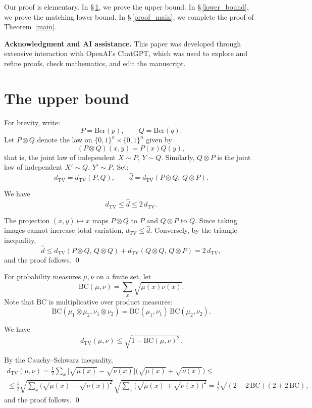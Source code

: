 \documentclass[12pt,reqno]{amsart}
\makeatletter
\renewenvironment{proof}[1][\proofname]{%
  \par\vspace{\topsep}%
  \normalfont\topsep6\p@\@plus6\p@\relax
  \trivlist
  \item[\hskip\labelsep\itshape #1\@addpunct{.}]\ignorespaces
}{%
  \endtrivlist
}
\numberwithin{equation}{section}
\makeatother
\begin{document}
Our proof is elementary. In \S\,\ref{cnot}, we prove the upper bound. In \S\,\ref{lower_bound}, we prove the matching lower bound. In \S\,\ref{proof_main}, we complete the proof of Theorem~\ref{main}. 
\smallskip%

\textbf{Acknowledgment and AI assistance.}
This paper was developed through extensive interaction with OpenAI's
ChatGPT, which was used to explore and refine proofs, check mathematics, and edit the manuscript.

\section{The upper bound}\label{cnot}

For brevity, write:
\[
P=\mathrm{Ber}(p),
\qquad
Q=\mathrm{Ber}(q).
\]
Let \(P\otimes Q\) denote the law on \(\{0,1\}^n\times\{0,1\}^n\) given by
\[
(P\otimes Q)(x,y)=P(x)Q(y),
\]
that is, the joint law of independent \(X\sim P\), \(Y\sim Q\). Similarly,
\(Q\otimes P\) is the joint law of independent \(X'\sim Q\), \(Y'\sim P\).
Set:
\[
d_{\mathrm{TV}}=d_{\mathrm{TV}}(P,Q),
\qquad
\widehat d=d_{\mathrm{TV}}(P\otimes Q,\,Q\otimes P).
\]
\begin{lemma}\label{doubling}
We have
\[
d_{\mathrm{TV}}\le\widehat d\le2\,d_{\mathrm{TV}}.
\]
\end{lemma}

\begin{proof}
The projection \((x,y)\mapsto x\) maps \(P\otimes Q\) to \(P\) and \(Q\otimes P\) to \(Q\). Since taking 
images cannot increase total
variation, \(d_{\mathrm{TV}}\le\widehat d\). Conversely, by the triangle inequality,
\[
\widehat d
\le
d_{\mathrm{TV}}(P\otimes Q,\,Q\otimes Q)
+
d_{\mathrm{TV}}(Q\otimes Q,\,Q\otimes P)
=
2\,d_{\mathrm{TV}},
\]
and the proof follows. \qed
\end{proof}

For probability measures \(\mu,\nu\) on a finite set, let
\[
\mathrm{BC}(\mu,\nu)=\sum_x\sqrt{\mu(x)\nu(x)}.
\]
Note that \(\mathrm{BC}\) is multiplicative over product measures:
\[
\mathrm{BC}(\mu_1\otimes\mu_2,\nu_1\otimes\nu_2)
=
\mathrm{BC}(\mu_1,\nu_1)\,\mathrm{BC}(\mu_2,\nu_2).
\]

\begin{lemma}\label{lecam}
We have
\[
d_{\mathrm{TV}}(\mu,\nu)\le\sqrt{1-\mathrm{BC}(\mu,\nu)^2}.
\]
\end{lemma}

\begin{proof}
By the Cauchy--Schwarz inequality,
\begin{multline*}
d_{\mathrm{TV}}(\mu,\nu)
=
\frac12\sum_x\bigl|\sqrt{\mu(x)}-\sqrt{\nu(x)}\bigr|
\bigl(\sqrt{\mu(x)}+\sqrt{\nu(x)}\bigr)
\le\\
\le
\frac12
\sqrt{\sum_x\bigl(\sqrt{\mu(x)}-\sqrt{\nu(x)}\bigr)^2}\,
\sqrt{\sum_x\bigl(\sqrt{\mu(x)}+\sqrt{\nu(x)}\bigr)^2}
=
\frac12\sqrt{(2-2\,\mathrm{BC})(2+2\,\mathrm{BC})},
\end{multline*}
and the proof follows. \qed
\end{proof}
\end{document}
